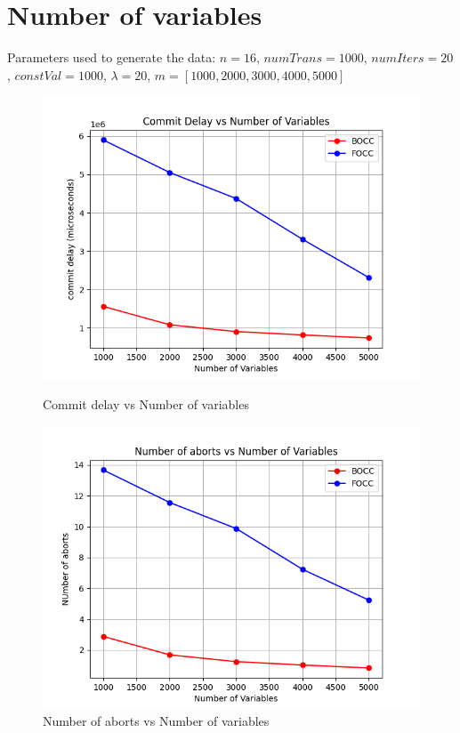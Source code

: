\documentclass[12pt]{article}
\begin{document}
\section*{Number of variables}
Parameters used to generate the data:
$n=16$, $numTrans=1000$, $numIters=20$, $constVal=1000$, $\lambda=20$, $m = [1000, 2000, 3000, 4000, 5000]$

\begin{figure}[h]
    \centering
    \begin{minipage}[b]{0.45\textwidth}
        \includegraphics[width=\textwidth]{../code/commitDelayVsNumVars.png}
        \caption{Commit delay vs Number of variables}
    \end{minipage}
    \hfill
    \begin{minipage}[b]{0.45\textwidth}
        \includegraphics[width=\textwidth]{../code/numAbortsVsNumVars.png}
        \caption{Number of aborts vs Number of variables}
    \end{minipage}
\end{figure}
\end{document}
